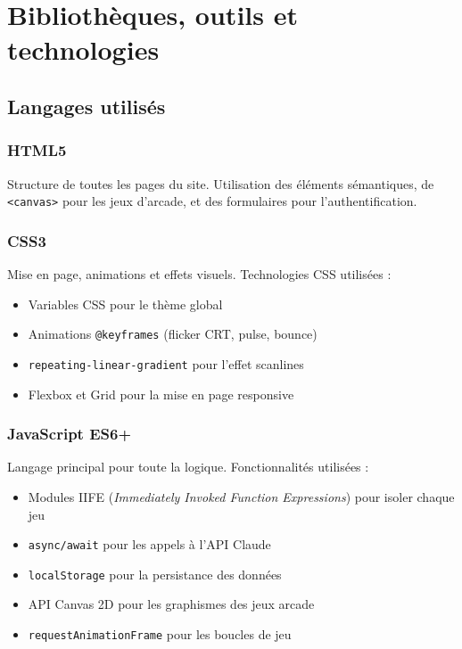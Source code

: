 \documentclass[a4paper, 12pt, twoside]{article}
\begin{document}
\newpage

\section{Bibliothèques, outils et technologies}

\subsection{Langages utilisés}

\subsubsection{HTML5}
Structure de toutes les pages du site. Utilisation des éléments sémantiques, de \texttt{<canvas>} pour les jeux d'arcade, et des formulaires pour l'authentification.

\subsubsection{CSS3}
Mise en page, animations et effets visuels. Technologies CSS utilisées :
\begin{itemize}
  \item Variables CSS pour le thème global
  \item Animations \texttt{@keyframes} (flicker CRT, pulse, bounce)
  \item \texttt{repeating-linear-gradient} pour l'effet scanlines
  \item Flexbox et Grid pour la mise en page responsive
\end{itemize}

\subsubsection{JavaScript ES6+}

Langage principal pour toute la logique. Fonctionnalités utilisées :
\begin{itemize}
  \item Modules IIFE (\textit{Immediately Invoked Function Expressions}) pour isoler chaque jeu
  \item \texttt{async/await} pour les appels à l'API Claude
  \item \texttt{localStorage} pour la persistance des données
  \item API Canvas 2D pour les graphismes des jeux arcade
  \item \texttt{requestAnimationFrame} pour les boucles de jeu
\end{itemize}
\end{document}
